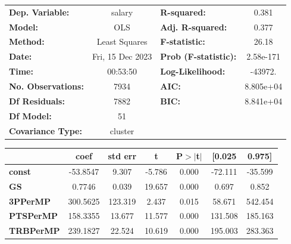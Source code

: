 \begin{center}
\begin{tabular}{lclc}
\toprule
\textbf{Dep. Variable:}       &      salary      & \textbf{  R-squared:         } &     0.381   \\
\textbf{Model:}               &       OLS        & \textbf{  Adj. R-squared:    } &     0.377   \\
\textbf{Method:}              &  Least Squares   & \textbf{  F-statistic:       } &     26.18   \\
\textbf{Date:}                & Fri, 15 Dec 2023 & \textbf{  Prob (F-statistic):} & 2.58e-171   \\
\textbf{Time:}                &     00:53:50     & \textbf{  Log-Likelihood:    } &   -43972.   \\
\textbf{No. Observations:}    &        7934      & \textbf{  AIC:               } & 8.805e+04   \\
\textbf{Df Residuals:}        &        7882      & \textbf{  BIC:               } & 8.841e+04   \\
\textbf{Df Model:}            &          51      & \textbf{                     } &             \\
\textbf{Covariance Type:}     &     cluster      & \textbf{                     } &             \\
\bottomrule
\end{tabular}
\begin{tabular}{lcccccc}
                              & \textbf{coef} & \textbf{std err} & \textbf{t} & \textbf{P$> |$t$|$} & \textbf{[0.025} & \textbf{0.975]}  \\
\midrule
\textbf{const}                &     -53.8547  &        9.307     &    -5.786  &         0.000        &      -72.111    &      -35.599     \\
\textbf{GS}                   &       0.7746  &        0.039     &    19.657  &         0.000        &        0.697    &        0.852     \\
\textbf{3PPerMP}              &     300.5625  &      123.319     &     2.437  &         0.015        &       58.671    &      542.454     \\
\textbf{PTSPerMP}             &     158.3355  &       13.677     &    11.577  &         0.000        &      131.508    &      185.163     \\
\textbf{TRBPerMP}             &     239.1827  &       22.524     &    10.619  &         0.000        &      195.003    &      283.363     \\

\end{tabular}
\end{center}
